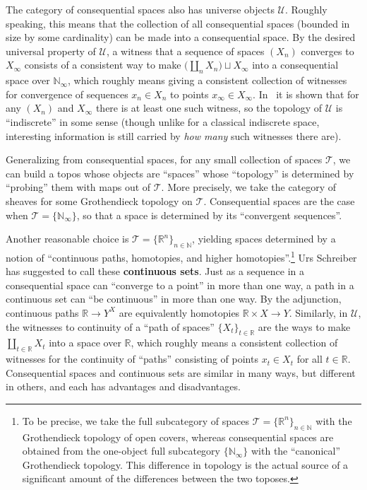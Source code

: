 \documentclass[12pt]{article}
\def\oo{\ensuremath{\infty}}
\def\N{\mathbb{N}}
\def\R{\mathbb{R}}
\def\U{\mathscr{U}}
\def\T{\mathcal{T}}
\numberwithin{equation}{section}
\begin{document}
The category of consequential spaces also has universe objects $\U$.
Roughly speaking, this means that the collection of all consequential spaces (bounded in size by some cardinality) can be made into a consequential space.
By the desired universal property of $\U$, a witness that a sequence of spaces $(X_n)$ converges to $X_\oo$ consists of a consistent way to make $\big(\coprod_{n} X_n\big)\sqcup X_\oo$ into a consequential space over $\N_\oo$, which roughly means giving a consistent collection of witnesses for convergence of sequences $x_n \in X_n$ to points $x_\oo\in X_\oo$.
In~\cite{es:universe-indiscrete} it is shown that for any $(X_n)$ and $X_\oo$ there is at least one such witness, so the topology of $\U$ is ``indiscrete'' in some sense (though unlike for a classical indiscrete space, interesting information is still carried by \emph{how many} such witnesses there are).

Generalizing from consequential spaces, for any small collection of spaces $\T$, we can build a topos whose objects are ``spaces'' whose ``topology'' is determined by ``probing'' them with maps out of $\T$.
More precisely, we take the category of sheaves for some Grothendieck topology on $\T$.
Consequential spaces are the case when $\T = \{\N_\oo\}$, so that a space is determined by its ``convergent sequences''.

Another reasonable choice is $\T = \{\R^n\}_{n\in \N}$, yielding spaces determined by a notion of ``continuous paths, homotopies, and higher homotopies''.\footnote{To be precise, we take the full subcategory of spaces $\T = \{\R^n\}_{n\in \N}$ with the Grothendieck topology of open covers, whereas consequential spaces are obtained from the one-object full subcategory $\{\N_\oo\}$ with the ``canonical'' Grothendieck topology.
  This difference in topology is the actual source of a significant amount of the differences between the two toposes.}
Urs Schreiber has suggested to call these \textbf{continuous sets}.
Just as a sequence in a consequential space can ``converge to a point'' in more than one way, a path in a continuous set can ``be continuous'' in more than one way.
By the adjunction, continuous paths $\R \to Y^X$ are equivalently homotopies $\R\times X\to Y$.
Similarly, in $\U$, the witnesses to continuity of a ``path of spaces'' $\{X_t\}_{t\in\R}$ are the ways to make $\coprod_{t\in\R} X_t$ into a space over $\R$, which roughly means a consistent collection of witnesses for the continuity of ``paths'' consisting of points $x_t\in X_t$ for all $t\in \R$.
%
Consequential spaces and continuous sets are similar in many ways, but different in others, and each has advantages and disadvantages.
\end{document}
